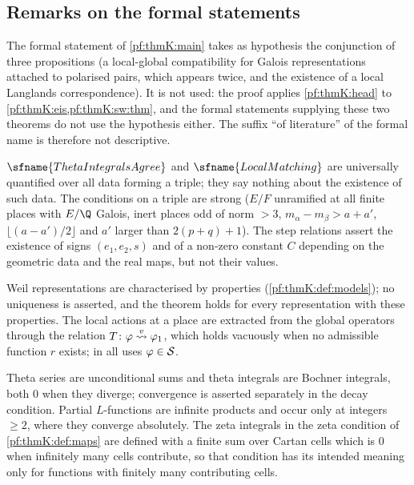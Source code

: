 \subsection{Remarks on the formal statements}\label{sec:pf:thmK:remarks}

\begin{remark}\label{pf:thmK:rem:unused}
The formal statement of \cref{pf:thmK:main} takes as hypothesis the conjunction of three propositions (a local-global
compatibility for Galois representations attached to polarised pairs, which appears twice, and the existence of a local
Langlands correspondence). It is not used: the proof applies \cref{pf:thmK:head} to \cref{pf:thmK:eis,pf:thmK:sw:thm}, and the
formal statements supplying these two theorems do not use the hypothesis either. The suffix ``of literature'' of the formal name is
therefore not descriptive.
\end{remark}

\begin{remark}\label{pf:thmK:rem:scope}
$\sfname{ThetaIntegralsAgree}$ and $\sfname{LocalMatching}$ are universally quantified over all data forming a triple; they say
nothing about the existence of such data. The conditions on a triple are strong ($E/F$ unramified at all finite places with
$E/\Q$ Galois, inert places odd of norm $>3$, $m_\alpha-m_\beta>a+a'$, $\lfloor(a-a')/2\rfloor$ and $a'$ larger than
$2(p+q)+1$). The step relations assert the existence of signs $(e_1,e_2,s)$ and of a non-zero constant $C$ depending on the
geometric data and the real maps, but not their values.
\end{remark}

\begin{remark}\label{pf:thmK:rem:weil}
Weil representations are characterised by properties (\cref{pf:thmK:def:models}); no uniqueness is asserted, and the theorem
holds for every representation with these properties. The local actions at a place are extracted from the global operators
through the relation $T\colon\varphi\mathrel{\stackrel{v}{\leadsto}}\varphi_1$, which holds vacuously when no admissible function $r$ exists; in
all uses $\varphi\in\mathcal{S}$.
\end{remark}

\begin{remark}\label{pf:thmK:rem:junk}
Theta series are unconditional sums and theta integrals are Bochner integrals, both $0$ when they diverge; convergence is
asserted separately in the decay condition. Partial $L$-functions are infinite products and occur only at integers $\ge2$,
where they converge absolutely. The zeta integrals in the zeta condition of \cref{pf:thmK:def:maps} are defined with a finite
sum over Cartan cells which is $0$ when infinitely many cells contribute, so that condition has its intended meaning only for
functions with finitely many contributing cells.
\end{remark}

